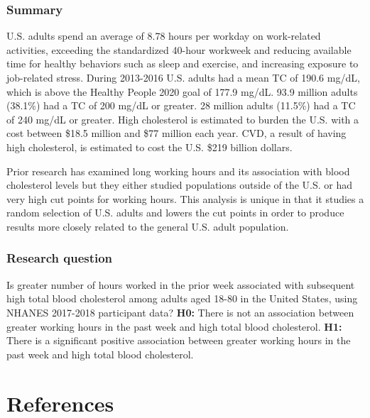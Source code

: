 \documentclass[]{elsarticle} %
\begin{document}
\hypertarget{summary}{%
\subsubsection{Summary}\label{summary}}

U.S. adults spend an average of 8.78 hours per workday on work-related
activities, exceeding the standardized 40-hour workweek and reducing
available time for healthy behaviors such as sleep and exercise, and
increasing exposure to job-related stress. During 2013-2016 U.S. adults
had a mean TC of 190.6 mg/dL, which is above the Healthy People 2020
goal of 177.9 mg/dL. 93.9 million adults (38.1\%) had a TC of 200 mg/dL
or greater. 28 million adults (11.5\%) had a TC of 240 mg/dL or greater.
High cholesterol is estimated to burden the U.S. with a cost between
\$18.5 million and \$77 million each year. CVD, a result of having high
cholesterol, is estimated to cost the U.S. \$219 billion dollars.

Prior research has examined long working hours and its association with
blood cholesterol levels but they either studied populations outside of
the U.S. or had very high cut points for working hours. This analysis is
unique in that it studies a random selection of U.S. adults and lowers
the cut points in order to produce results more closely related to the
general U.S. adult population.

\hypertarget{research-question}{%
\subsubsection{Research question}\label{research-question}}

Is greater number of hours worked in the prior week associated with
subsequent high total blood cholesterol among adults aged 18-80 in the
United States, using NHANES 2017-2018 participant data? \textbf{H0:}
There is not an association between greater working hours in the past
week and high total blood cholesterol. \textbf{H1:} There is a
significant positive association between greater working hours in the
past week and high total blood cholesterol.

\hypertarget{references}{%
\section*{References}\label{references}}
\end{document}
